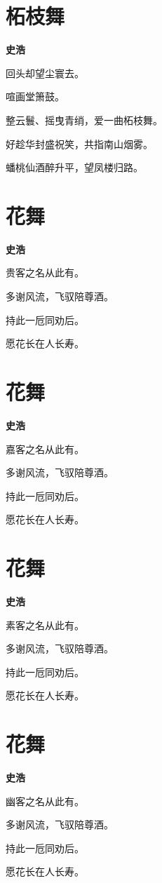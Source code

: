 \documentclass[12pt,a4paper]{ctexbook}
\begin{document}
\section{柘枝舞}
\textbf{史浩}\par\vspace{0.5em}
回头却望尘寰去。\par
喧画堂箫鼓。\par
整云鬟、摇曳青绡，爱一曲柘枝舞。\par
好趁华封盛祝笑，共指南山烟雾。\par
蟠桃仙酒醉升平，望凤楼归路。\par

\section{花舞}
\textbf{史浩}\par\vspace{0.5em}
贵客之名从此有。\par
多谢风流，飞驭陪尊酒。\par
持此一卮同劝后。\par
愿花长在人长寿。\par

\section{花舞}
\textbf{史浩}\par\vspace{0.5em}
嘉客之名从此有。\par
多谢风流，飞驭陪尊酒。\par
持此一卮同劝后。\par
愿花长在人长寿。\par

\section{花舞}
\textbf{史浩}\par\vspace{0.5em}
素客之名从此有。\par
多谢风流，飞驭陪尊酒。\par
持此一卮同劝后。\par
愿花长在人长寿。\par

\section{花舞}
\textbf{史浩}\par\vspace{0.5em}
幽客之名从此有。\par
多谢风流，飞驭陪尊酒。\par
持此一卮同劝后。\par
愿花长在人长寿。\par
\end{document}
